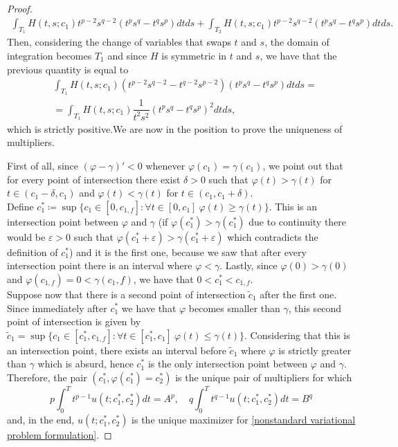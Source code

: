 \documentclass[corpo=11pt, stile=classica, tipotesi=custom,
greek, evenboxes, english]{toptesi}
\numberwithin{equation}{chapter}
\theoremstyle{definition}
\theoremstyle{remark}
\begin{document}
\begin{proof}
\begin{equation*}
	\begin{split}
		\int_{T_1} H(t,s;c_1)t^{p-2}s^{q-2}\left( t^p s^q - t^q s^p \right)dtds + \int_{T_2} H(t,s;c_1)t^{p-2}s^{q-2}\left( t^p s^q - t^q s^p \right)dtds.
	\end{split}
\end{equation*}
Then, considering the change of variables that swaps $t$ and $s$, the domain of integration becomes $T_1$ and since $H$ is symmetric in $t$ and $s$, we have that the previous quantity is equal to
\begin{equation*}
	\begin{split}
		&\int_{T_1} H(t,s;c_1)\left( t^{p-2} s^{q-2} - t^{q-2} s^{p-2} \right) \left( t^p s^q - t^q s^p \right)dtds =\\
		&= \int_{T_1} H(t,s;c_1)\dfrac{1}{t^2 s^2}\left( t^p s^q - t^q s^p \right)^2 dtds,
	\end{split}
\end{equation*}
which is strictly positive.We are now in the position to prove the uniqueness of multipliers.

First of all, since $(\varphi-\gamma)'<0$ whenever $\varphi(c_1) = \gamma(c_1)$, we point out that for every point of intersection there exist $\delta>0$ such that $\varphi(t) > \gamma(t)$ for $t \in (c_1 - \delta, c_1)$ and $\varphi(t) < \gamma(t)$ for $t \in (c_1, c_1 + \delta)$.\\
Define $c_1^* \coloneqq \sup \{c_1 \in [0,c_{1,f}] : \forall t \in [0,c_1] \ \varphi(t) \geq \gamma(t)\}$. This is an intersection point between $\varphi$ and $\gamma$ (if $\varphi(c_1^*) > \gamma(c_1^*)$ due to continuity there would be $\varepsilon > 0$ such that $\varphi(c_1^*+\varepsilon) > \gamma(c_1^*+\varepsilon)$ which contradicts the definition of $c_1^*$) and it is the first one, because we saw that after every intersection point there is an interval where $\varphi < \gamma$. Lastly, since $\varphi(0) > \gamma(0)$ and $\varphi(c_{1,f}) = 0 < \gamma(c_1,f)$, we have that $0 < c_1^* < c_{1,f}$.\\
Suppose now that there is a second point of intersection $\tilde{c}_1$ after the first one. Since immediately after $c_1^*$ we have that $\varphi$ becomes smaller than $\gamma$, this second point of intersection is given by $\tilde{c}_1 = \sup \{c_1 \in [c_1^*,c_{1,f}] : \forall t \in [c_1^*,c_1] \ \varphi(t) \leq \gamma(t)\}$. Considering that this is an intersection point, there exists an interval before $\tilde{c}_1$ where $\varphi$ is strictly greater than $\gamma$ which is absurd, hence $c_1^*$ is the only intersection point between $\varphi$ and $\gamma$.\\
Therefore, the pair $(c_1^*, \varphi(c_1^*) = c_2^*)$ is the unique pair of multipliers for which 
\begin{equation*}
	p\int_0^T t^{p-1} u(t;c_1^*,c_2^*)dt = A^p, \quad q\int_0^T t^{q-1} u(t;c_1^*,c_2^*)dt = B^q
\end{equation*}
and, in the end, $u(t;c_1^*,c_2^*)$ is the unique maximizer for \eqref{nonstandard variational problem formulation}.
\end{proof}
\end{document}
